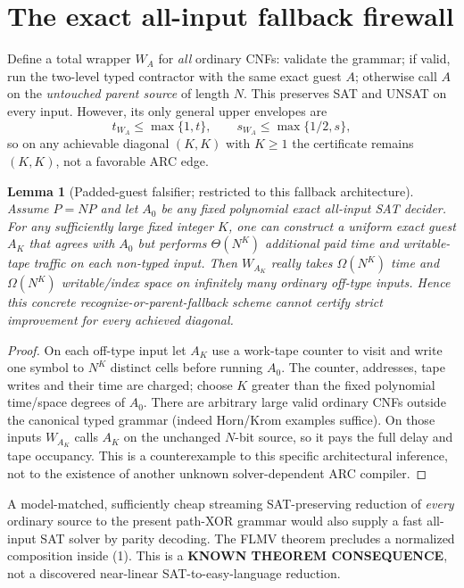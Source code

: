 \documentclass[11pt]{article}
\newtheorem{lemma}[theorem]{Lemma}
\begin{document}
\section{The exact all-input fallback firewall}

Define a total wrapper $W_A$ for \emph{all} ordinary
CNFs: validate the grammar; if valid, run the two-level
typed contractor with the same exact guest $A$;
otherwise call $A$ on the \emph{untouched parent source}
of length $N$. This preserves SAT and UNSAT on every
input. However, its only general upper envelopes are
\[
 t_{W_A}\le \max\{1,t\},\qquad
 s_{W_A}\le \max\{1/2,s\},
 \tag{9}
\]
so on any achievable diagonal $(K,K)$ with $K\ge1$
the certificate remains $(K,K)$, not a favorable ARC edge.

\begin{lemma}[Padded-guest falsifier; restricted to this
fallback architecture]
Assume $P=NP$ and let $A_0$ be any fixed polynomial
exact all-input SAT decider. For any sufficiently large
fixed integer $K$, one can construct a uniform exact
guest $A_K$ that agrees with $A_0$ but performs
$\Theta(N^K)$ additional paid time and writable-tape
traffic on each non-typed input. Then $W_{A_K}$
really takes $\Omega(N^K)$ time and
$\Omega(N^K)$ writable/index space on infinitely many
ordinary off-type inputs. Hence this concrete
recognize-or-parent-fallback scheme cannot certify
strict improvement for every achieved diagonal.
\end{lemma}
\begin{proof}
On each off-type input let $A_K$ use a work-tape
counter to visit and write one symbol to
$N^K$ distinct cells before running $A_0$.
The counter, addresses, tape writes and their time
are charged; choose $K$ greater than the fixed
polynomial time/space degrees of $A_0$.
There are arbitrary large valid ordinary CNFs outside
the canonical typed grammar (indeed Horn/Krom
examples suffice). On those inputs $W_{A_K}$
calls $A_K$ on the unchanged $N$-bit source,
so it pays the full delay and tape occupancy.
This is a counterexample to this specific
architectural inference, not to the existence
of another unknown solver-dependent ARC compiler.
\end{proof}

A model-matched, sufficiently cheap streaming
SAT-preserving reduction of \emph{every} ordinary
source to the present path-XOR grammar would also
supply a fast all-input SAT solver by parity
decoding. The FLMV theorem precludes a normalized
composition inside (1). This is a \textbf{KNOWN
THEOREM CONSEQUENCE}, not a discovered
near-linear SAT-to-easy-language reduction.
\end{document}
